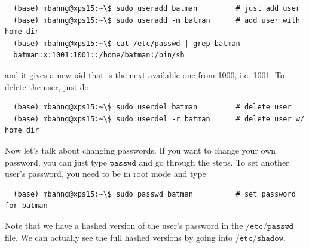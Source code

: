   \begin{lstlisting}
  (base) mbahng@xps15:~\$ sudo useradd batman         # just add user 
  (base) mbahng@xps15:~\$ sudo useradd -m batman      # add user with home dir 
  (base) mbahng@xps15:~\$ cat /etc/passwd | grep batman
  batman:x:1001:1001::/home/batman:/bin/sh
  \end{lstlisting}
  and it gives a new uid that is the next available one from 1000, i.e. 1001. To delete the user, just do 
  \begin{lstlisting}
  (base) mbahng@xps15:~\$ sudo userdel batman         # delete user
  (base) mbahng@xps15:~\$ sudo userdel -r batman      # delete user w/ home dir
  \end{lstlisting}
  Now let's talk about changing passwords. If you want to change your own password, you can just type $\texttt{passwd}$ and go through the steps. To set another user's password, you need to be in root mode and type 
  \begin{lstlisting}
  (base) mbahng@xps15:~\$ sudo passwd batman          # set password for batman
  \end{lstlisting}

  Note that we have a hashed version of the user's password in the $\texttt{/etc/passwd}$ file. We can actually see the full hashed versions by going into $\texttt{/etc/shadow}$. 

